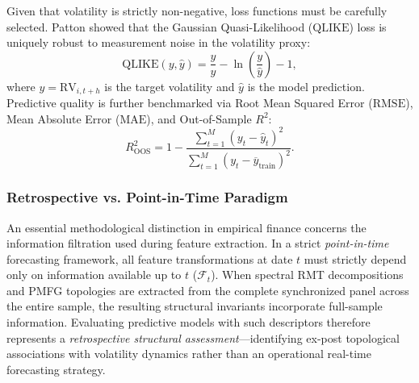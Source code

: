 Given that volatility is strictly non-negative, loss functions must be carefully selected. Patton \cite{patton_2011_volatility} showed that the Gaussian Quasi-Likelihood ($\mathrm{QLIKE}$) loss is uniquely robust to measurement noise in the volatility proxy:
\begin{equation}
\mathrm{QLIKE}(y, \widehat{y}) = \frac{y}{\widehat{y}} - \ln\left(\frac{y}{\widehat{y}}\right) - 1,
\label{eq:theory_qlike}
\end{equation}
where $y = \mathrm{RV}_{i,t+h}$ is the target volatility and $\widehat{y}$ is the model prediction. Predictive quality is further benchmarked via Root Mean Squared Error ($\mathrm{RMSE}$), Mean Absolute Error ($\mathrm{MAE}$), and Out-of-Sample $R^2$:
\begin{equation}
R_{\mathrm{OOS}}^2 = 1 - \frac{\sum_{t=1}^M (y_t - \widehat{y}_t)^2}{\sum_{t=1}^M (y_t - \overline{y}_{\mathrm{train}})^2}.
\label{eq:theory_oos_r2}
\end{equation}

\subsubsection{Retrospective vs. Point-in-Time Paradigm}
An essential methodological distinction in empirical finance concerns the information filtration used during feature extraction. In a strict \emph{point-in-time} forecasting framework, all feature transformations at date $t$ must strictly depend only on information available up to $t$ ($\mathcal{F}_t$). When spectral RMT decompositions and PMFG topologies are extracted from the complete synchronized panel across the entire sample, the resulting structural invariants incorporate full-sample information. Evaluating predictive models with such descriptors therefore represents a \emph{retrospective structural assessment}---identifying ex-post topological associations with volatility dynamics rather than an operational real-time forecasting strategy.

